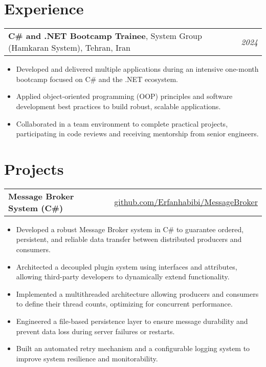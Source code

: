 \documentclass[10pt,a4paper]{article}
\begin{document}
\section{Experience}
\begin{tabularx}{\textwidth}{Xr}
    \textbf{C\# and .NET Bootcamp Trainee}, System Group (Hamkaran System), Tehran, Iran & \textit{2024} \\
\end{tabularx}
\begin{itemize}
    \item Developed and delivered multiple applications during an intensive one-month bootcamp focused on C\# and the .NET ecosystem.
    \item Applied object-oriented programming (OOP) principles and software development best practices to build robust, scalable applications.
    \item Collaborated in a team environment to complete practical projects, participating in code reviews and receiving mentorship from senior engineers.
\end{itemize}


\section{Projects}
\begin{tabularx}{\textwidth}{X@{\hskip 1em}r}
    \textbf{Message Broker System (C\#)} & \href{https://github.com/Erfanhabibi/MessageBroker}{github.com/Erfanhabibi/MessageBroker} \\
\end{tabularx}
\begin{itemize}
    \item Developed a robust Message Broker system in C\# to guarantee ordered, persistent, and reliable data transfer between distributed producers and consumers.
    \item Architected a decoupled plugin system using interfaces and attributes, allowing third-party developers to dynamically extend functionality.
    \item Implemented a multithreaded architecture allowing producers and consumers to define their thread counts, optimizing for concurrent performance.
    \item Engineered a file-based persistence layer to ensure message durability and prevent data loss during server failures or restarts.
    \item Built an automated retry mechanism and a configurable logging system to improve system resilience and monitorability.
\end{itemize}
\end{document}
